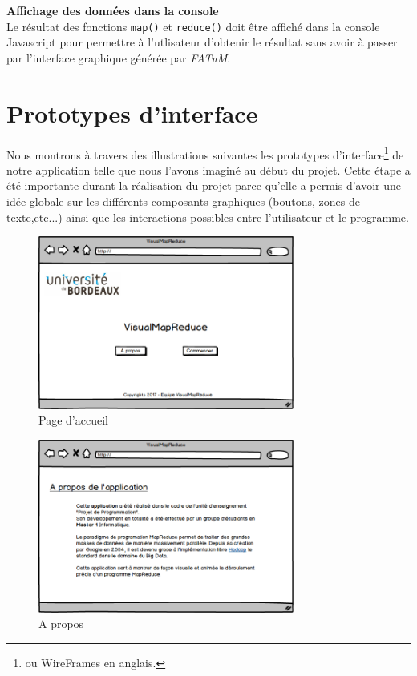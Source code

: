 \textbf{Affichage des données dans la console\\} Le résultat des fonctions \texttt{map()} et \texttt{reduce()} doit être affiché dans la console Javascript pour permettre à l'utlisateur d'obtenir le résultat sans avoir à passer par l'interface graphique générée par \textit{FATuM}.




\section{Prototypes d'interface}%
Nous montrons à travers des illustrations suivantes les prototypes d'interface\footnote{ou WireFrames en anglais.} de notre application telle que nous l'avons imaginé au début du projet. Cette étape a été importante durant la réalisation du projet parce qu'elle a permis d'avoir une idée globale sur les différents composants graphiques (boutons, zones de texte,etc...) ainsi que les interactions possibles entre l'utilisateur et le programme.\\ 
\begin{figure}[H]
  \centering
    \includegraphics[width=0.75\textwidth]{images/interface/page_accueil.png}
    \caption{Page d'accueil}
\end{figure}

\begin{figure}[H]
  \centering
    \includegraphics[width=0.75\textwidth]{images/interface/page_a_propos.png}
    \caption{A propos}
\end{figure}

